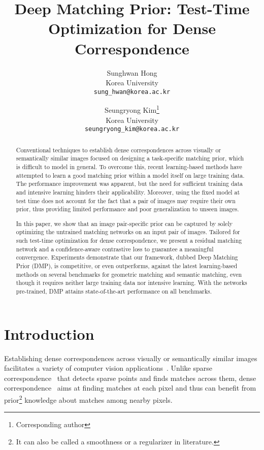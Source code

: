 \documentclass[10pt,twocolumn,letterpaper]{article}
\begin{document}
\title{Deep Matching Prior: Test-Time Optimization for Dense Correspondence}
\author{Sunghwan Hong \\ 
Korea University \\
{\tt\small sung\_hwan@korea.ac.kr}
\and
Seungryong Kim\thanks{Corresponding author} \\
Korea University \\
{\tt\small seungryong\_kim@korea.ac.kr}
}

\maketitle
\ificcvfinal\thispagestyle{empty}\fi

\begin{abstract}
Conventional techniques to establish dense correspondences across visually or semantically similar images focused on designing a task-specific matching prior, which is difficult to model in general. To overcome this, recent learning-based methods have attempted to learn a good matching prior within a model itself on large training data. The performance improvement was apparent, but the need for sufficient training data and intensive learning hinders their applicability. Moreover, using the fixed model at test time does not account for the fact that a pair of images may require their own prior, thus providing limited performance and poor generalization to unseen images. 

In this paper, we show that an image pair-specific prior can be captured by solely optimizing the untrained matching networks on an input pair of images. 
Tailored for such test-time optimization for dense correspondence, we present a residual matching network and a confidence-aware contrastive loss to guarantee a meaningful convergence. Experiments demonstrate that our framework, dubbed Deep Matching Prior (DMP), is competitive, or even outperforms, against the latest learning-based methods on several benchmarks for geometric matching and semantic matching, even though it requires neither large training data nor intensive learning. With the networks pre-trained, DMP attains state-of-the-art performance on all benchmarks. 
\end{abstract}

\section{Introduction}
Establishing dense correspondences across visually or semantically similar images facilitates a variety of computer vision applications~\cite{liu2010sift,liao2017visual,jeon2019joint,kim2019semantic}. Unlike sparse correspondence~\cite{lowe2004distinctive,calonder2010brief,yi2016lift} that detects sparse points and finds matches across them, dense correspondence~\cite{liu2010sift,chang2018pyramid,kim2018recurrent,kim2019semantic} aims at finding matches at each pixel and thus can benefit from prior\footnote{It can also be called a smoothness or a regularizer in literature.} knowledge about matches among nearby pixels. 
\end{document}
